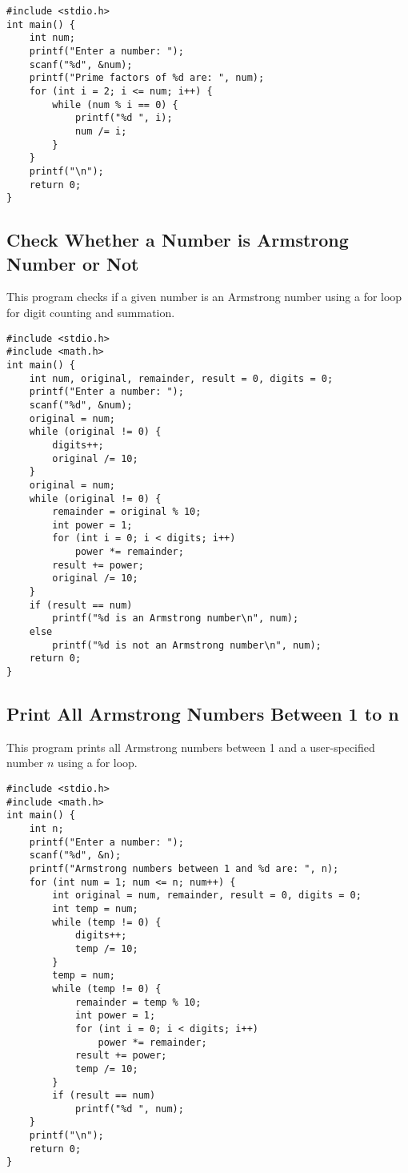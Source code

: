 \documentclass[a4paper,12pt]{article}
\begin{document}
\begin{lstlisting}[caption={Find All Prime Factors of a Number}]
#include <stdio.h>
int main() {
    int num;
    printf("Enter a number: ");
    scanf("%d", &num);
    printf("Prime factors of %d are: ", num);
    for (int i = 2; i <= num; i++) {
        while (num % i == 0) {
            printf("%d ", i);
            num /= i;
        }
    }
    printf("\n");
    return 0;
}
\end{lstlisting}

\newpage

\subsection{Check Whether a Number is Armstrong Number or Not}
This program checks if a given number is an Armstrong number using a for loop for digit counting and summation.

\begin{lstlisting}[caption={Check Whether a Number is Armstrong Number or Not}]
#include <stdio.h>
#include <math.h>
int main() {
    int num, original, remainder, result = 0, digits = 0;
    printf("Enter a number: ");
    scanf("%d", &num);
    original = num;
    while (original != 0) {
        digits++;
        original /= 10;
    }
    original = num;
    while (original != 0) {
        remainder = original % 10;
        int power = 1;
        for (int i = 0; i < digits; i++)
            power *= remainder;
        result += power;
        original /= 10;
    }
    if (result == num)
        printf("%d is an Armstrong number\n", num);
    else
        printf("%d is not an Armstrong number\n", num);
    return 0;
}
\end{lstlisting}

\newpage

\subsection{Print All Armstrong Numbers Between 1 to n}
This program prints all Armstrong numbers between 1 and a user-specified number \(n\) using a for loop.

\begin{lstlisting}[caption={Print All Armstrong Numbers Between 1 to n}]
#include <stdio.h>
#include <math.h>
int main() {
    int n;
    printf("Enter a number: ");
    scanf("%d", &n);
    printf("Armstrong numbers between 1 and %d are: ", n);
    for (int num = 1; num <= n; num++) {
        int original = num, remainder, result = 0, digits = 0;
        int temp = num;
        while (temp != 0) {
            digits++;
            temp /= 10;
        }
        temp = num;
        while (temp != 0) {
            remainder = temp % 10;
            int power = 1;
            for (int i = 0; i < digits; i++)
                power *= remainder;
            result += power;
            temp /= 10;
        }
        if (result == num)
            printf("%d ", num);
    }
    printf("\n");
    return 0;
}
\end{lstlisting}
\end{document}
